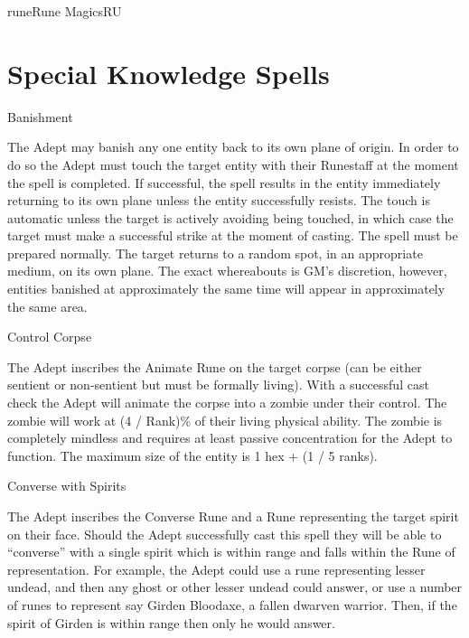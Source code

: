 \begin{College}[2.2]{rune}{Rune Magics}{RU}
\section{Special Knowledge Spells}

\begin{spell}[S-1]{Banishment}

\begin{effects}
The Adept may banish any one entity back to its own plane of origin.
In order to do so the Adept must touch the target entity with their
Runestaff at the moment the spell is completed.  If successful, the
spell results in the entity immediately returning to its own plane
unless the entity successfully resists.  The touch is automatic unless
the target is actively avoiding being touched, in which case the
target must make a successful strike at the moment of casting.  The
spell must be prepared normally.  The target returns to a random spot,
in an appropriate medium, on its own plane.  The exact whereabouts is
GM’s discretion, however, entities banished at approximately the same
time will appear in approximately the same area.
\end{effects}
\end{spell}

\begin{spell}[S-2]{Control Corpse}

\begin{effects}
The Adept inscribes the Animate Rune on the target corpse (can be
either sentient or non-sentient but must be formally living).  With a
successful cast check the Adept will animate the corpse into a zombie
under their control. The zombie will work at (4 / Rank)\% of their
living physical ability. The zombie is completely mindless and
requires at least passive concentration for the Adept to function. The
maximum size of the entity is 1 hex + (1 / 5 ranks).
\end{effects}
\end{spell}

\begin{spell}[S-3]{Converse with Spirits}

\begin{effects}
The Adept inscribes the Converse Rune and a Rune representing the
target spirit on their face.  Should the Adept successfully cast this
spell they will be able to “converse” with a single spirit which is
within range and falls within the Rune of representation. For example,
the Adept could use a rune representing lesser undead, and then any
ghost or other lesser undead could answer, or use a number of runes
to represent say Girden Bloodaxe, a fallen dwarven warrior.  Then, if
the spirit of Girden is within range then only he would answer.


\end{effects}
\end{spell}
\end{College}
